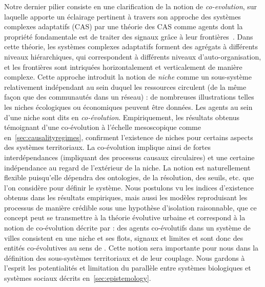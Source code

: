 {Notre dernier pilier consiste en une clarification de la notion de \emph{co-evolution}, sur laquelle  apporte un éclairage pertinent à travers son approche des systèmes complexes adaptatifs (CAS) par une théorie des CAS comme agents dont la propriété fondamentale est de traiter des signaux grâce à leur frontières~\cite{holland2012signals}. Dans cette théorie, les systèmes complexes adaptatifs forment des agrégats à différents niveaux hiérarchiques, qui correspondent à différents niveaux d'auto-organisation, et les frontières sont intriquées horizontalement et verticalement de manière complexe. Cette approche introduit la notion de \emph{niche} comme un sous-système relativement indépendant au sein duquel les ressources circulent (de la même façon que des communautés dans un réseau) : de nombreuses illustrations telles les niches écologiques ou économiques peuvent être données. Les agents au sein d'une niche sont dits en \emph{co-évolution}. Empiriquement, les résultats obtenus témoignant d'une co-évolution à l'échelle mesoscopique comme en~\ref{sec:causalityregimes}, confirment l'existence de niches pour certains aspects des systèmes territoriaux. La co-évolution implique ainsi de fortes interdépendances (impliquant des processus causaux circulaires) et une certaine indépendance au regard de l'extérieur de la niche. La notion est naturellement flexible puisqu'elle dépendra des ontologies, de la résolution, des seuils, etc. que l'on considère pour définir le système. Nous postulons vu les indices d'existence obtenus dans les résultats empiriques, mais aussi les modèles reproduisant les processus de manière crédible sous une hypothèse d'isolation raisonnable, que ce concept peut se transmettre à la théorie évolutive urbaine et correspond à la notion de co-évolution décrite par  : des agents co-évolutifs dans un système de villes consistent en une niche et ses flots, signaux et limites et sont donc des entités co-évolutives au sens de . Cette notion sera importante pour nous dans la définition des sous-systèmes territoriaux et de leur couplage. Nous gardons à l'esprit les potentialités et limitation du parallèle entre systèmes biologiques et systèmes sociaux décrits en~\ref{sec:epistemology}.
}







